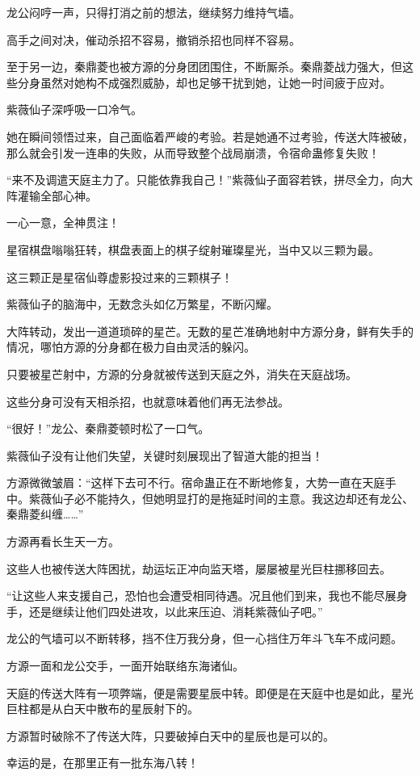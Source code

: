 \begin{this_body}
龙公闷哼一声，只得打消之前的想法，继续努力维持气墙。

高手之间对决，催动杀招不容易，撤销杀招也同样不容易。

至于另一边，秦鼎菱也被方源的分身团团围住，不断厮杀。秦鼎菱战力强大，但这些分身虽然对她构不成强烈威胁，却也足够干扰到她，让她一时间疲于应对。

紫薇仙子深呼吸一口冷气。

她在瞬间领悟过来，自己面临着严峻的考验。若是她通不过考验，传送大阵被破，那么就会引发一连串的失败，从而导致整个战局崩溃，令宿命蛊修复失败！

“来不及调遣天庭主力了。只能依靠我自己！”紫薇仙子面容若铁，拼尽全力，向大阵灌输全部心神。

一心一意，全神贯注！

星宿棋盘嗡嗡狂转，棋盘表面上的棋子绽射璀璨星光，当中又以三颗为最。

这三颗正是星宿仙尊虚影投过来的三颗棋子！

紫薇仙子的脑海中，无数念头如亿万繁星，不断闪耀。

大阵转动，发出一道道琐碎的星芒。无数的星芒准确地射中方源分身，鲜有失手的情况，哪怕方源的分身都在极力自由灵活的躲闪。

只要被星芒射中，方源的分身就被传送到天庭之外，消失在天庭战场。

这些分身可没有天相杀招，也就意味着他们再无法参战。

“很好！”龙公、秦鼎菱顿时松了一口气。

紫薇仙子没有让他们失望，关键时刻展现出了智道大能的担当！

方源微微皱眉：“这样下去可不行。宿命蛊正在不断地修复，大势一直在天庭手中。紫薇仙子必不能持久，但她明显打的是拖延时间的主意。我这边却还有龙公、秦鼎菱纠缠……”

方源再看长生天一方。

这些人也被传送大阵困扰，劫运坛正冲向监天塔，屡屡被星光巨柱挪移回去。

“让这些人来支援自己，恐怕也会遭受相同待遇。况且他们到来，我也不能尽展身手，还是继续让他们四处进攻，以此来压迫、消耗紫薇仙子吧。”

龙公的气墙可以不断转移，挡不住万我分身，但一心挡住万年斗飞车不成问题。

方源一面和龙公交手，一面开始联络东海诸仙。

天庭的传送大阵有一项弊端，便是需要星辰中转。即便是在天庭中也是如此，星光巨柱都是从白天中散布的星辰射下的。

方源暂时破除不了传送大阵，只要破掉白天中的星辰也是可以的。

幸运的是，在那里正有一批东海八转！

\end{this_body}

